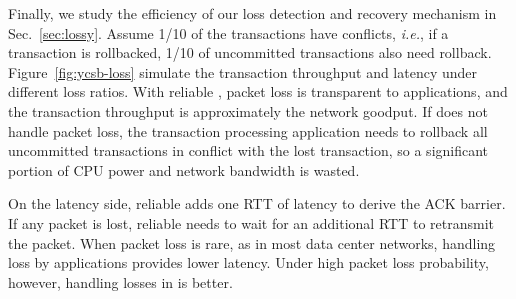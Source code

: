 Finally, we study the efficiency of our loss detection and recovery mechanism in Sec.~\ref{sec:lossy}.
Assume 1/10 of the transactions have conflicts, \textit{i.e.}, if a transaction is rollbacked, 1/10 of uncommitted transactions also need rollback.
Figure~\ref{fig:ycsb-loss} simulate the transaction throughput and latency under different loss ratios. With reliable \sys, packet loss is transparent to applications, and the transaction throughput is approximately the network goodput. If \sys does not handle packet loss, the transaction processing application needs to rollback all uncommitted transactions in conflict with the lost transaction, so a significant portion of CPU power and network bandwidth is wasted.

On the latency side, reliable \sys adds one RTT of latency to derive the ACK barrier. If any packet is lost, reliable \sys needs to wait for an additional RTT to retransmit the packet. When packet loss is rare, as in most data center networks, handling loss by applications provides lower latency. Under high packet loss probability, however, handling losses in \sys is better.

